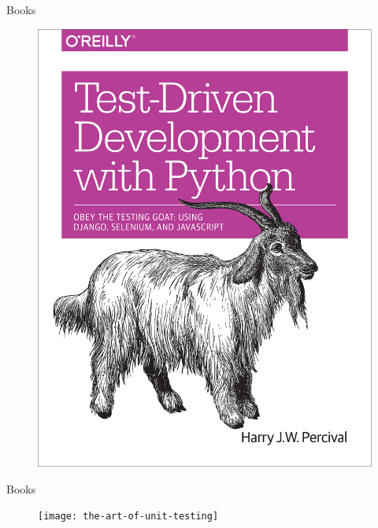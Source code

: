 \documentclass[14pt]{beamer}
\begin{document}
\begin{frame}[plain]{Books}
    \begin{figure}
        \center
        \includegraphics[height=.7\textheight]{TDD-with-Python}
        \label{fig:TDD-with-Python}
    \end{figure}
\end{frame}

\begin{frame}[plain]{Books}
    \begin{figure}
        \center
        \texttt{[image: the-art-of-unit-testing]}
        \label{fig:the-art-of-unit-testing}
    \end{figure}
\end{frame}
\end{document}
